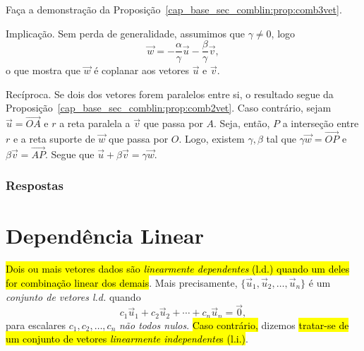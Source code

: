 \begin{exer}\label{cap_base_sec_comblin:exer:comb3vet}
  Faça a demonstração da Proposição~\ref{cap_base_sec_comblin:prop:comb3vet}.
\end{exer}
\begin{resp}
  Implicação. Sem perda de generalidade, assumimos que $\gamma \neq 0$, logo
  \begin{equation}
    \vec{w} = -\frac{\alpha}{\gamma}\vec{u} - \frac{\beta}{\gamma}\vec{v},  
  \end{equation}
  o que mostra que $\vec{w}$ é coplanar aos vetores $\vec{u}$ e $\vec{v}$.

  Recíproca. Se dois dos vetores forem paralelos entre si, o resultado segue da Proposição~\ref{cap_base_sec_comblin:prop:comb2vet}. Caso contrário, sejam $\vec{u} = \overrightarrow{OA}$ e $r$ a reta paralela a $\vec{v}$ que passa por $A$. Seja, então, $P$ a interseção entre $r$ e a reta suporte de $\vec{w}$ que passa por $O$. Logo, existem $\gamma,\beta$ tal que $\gamma\vec{w} = \overrightarrow{OP}$ e $\beta\vec{v} = \overrightarrow{AP}$. Segue que $\vec{u}+\beta\vec{v} = \gamma\vec{w}$.
\end{resp}

\ifisbook
\subsubsection{Respostas}
\shipoutAnswer
\fi


\section{Dependência Linear}\label{cap_base_sec_deplinear}

\hl{Dois ou mais vetores dados são \emph{linearmente dependentes} (l.d.) quando um deles for combinação linear dos demais}. Mais precisamente, $\{\vec{u}_1, \vec{u}_2, \ldots, \vec{u}_n\}$ é um \emph{conjunto de vetores l.d.} quando
\begin{equation}
  c_1 \vec{u}_1 + c_2\vec{u}_2 + \cdots + c_n\vec{u}_n = \vec{0},
\end{equation}
para escalares $c_1, c_2, \ldots, c_n$ \emph{não todos nulos}. \hl{Caso contrário,} dizemos \hl{tratar-se de um conjunto de vetores \emph{linearmente independente}s (l.i.)}.

